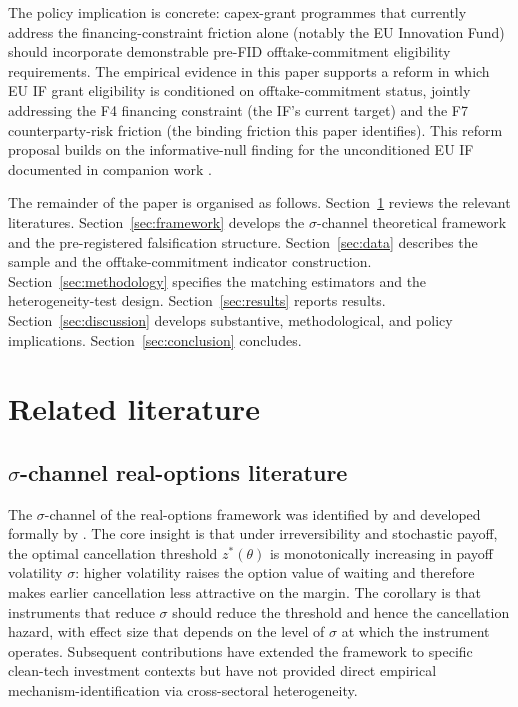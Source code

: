 \documentclass[12pt,a4paper]{article}
\theoremstyle{plain}
\theoremstyle{definition}
\begin{document}
The policy implication is concrete: capex-grant programmes that currently address the financing-constraint friction alone (notably the EU Innovation Fund) should incorporate demonstrable pre-FID offtake-commitment eligibility requirements. The empirical evidence in this paper supports a reform in which EU IF grant eligibility is conditioned on offtake-commitment status, jointly addressing the F4 financing constraint (the IF's current target) and the F7 counterparty-risk friction (the binding friction this paper identifies). This reform proposal builds on the informative-null finding for the unconditioned EU IF documented in companion work \cite{saakstra2026paper2}.

The remainder of the paper is organised as follows. Section~\ref{sec:literature} reviews the relevant literatures. Section~\ref{sec:framework} develops the $\sigma$-channel theoretical framework and the pre-registered falsification structure. Section~\ref{sec:data} describes the sample and the offtake-commitment indicator construction. Section~\ref{sec:methodology} specifies the matching estimators and the heterogeneity-test design. Section~\ref{sec:results} reports results. Section~\ref{sec:discussion} develops substantive, methodological, and policy implications. Section~\ref{sec:conclusion} concludes.

\section{Related literature}
\label{sec:literature}

\subsection{$\sigma$-channel real-options literature}
\label{sec:lit-sigma}

The $\sigma$-channel of the real-options framework was identified by \cite{pindyck1991irreversibility} and developed formally by \cite{dixit1994investment}. The core insight is that under irreversibility and stochastic payoff, the optimal cancellation threshold $z^{*}(\theta)$ is monotonically increasing in payoff volatility $\sigma$: higher volatility raises the option value of waiting and therefore makes earlier cancellation less attractive on the margin. The corollary is that instruments that reduce $\sigma$ should reduce the threshold and hence the cancellation hazard, with effect size that depends on the level of $\sigma$ at which the instrument operates. Subsequent contributions \cite{abel1996options, fuss2012impact, hosseini2022real} have extended the framework to specific clean-tech investment contexts but have not provided direct empirical mechanism-identification via cross-sectoral heterogeneity.
\end{document}
